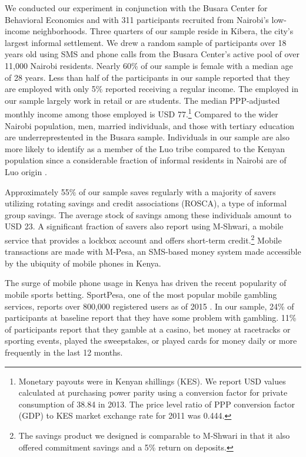 \documentclass[11pt]{article}
\begin{document}
		We conducted our experiment in conjunction with the Busara Center for Behavioral Economics and with 311 participants recruited from Nairobi's low-income neighborhoods. Three quarters of our sample reside in Kibera, the city's largest informal settlement. We drew a random sample of participants over 18 years old using SMS and phone calls from the Busara Center's active pool of over 11,000 Nairobi residents. Nearly 60\% of our sample is female with a median age of 28 years. Less than half of the participants in our sample reported that they are employed with only 5\% reported receiving a regular income. The employed in our sample largely work in retail or are students. The median PPP-adjusted monthly income among those employed is USD 77.\footnote{Monetary payouts were in Kenyan shillings (KES). We report USD values calculated at purchasing power parity using a conversion factor for private consumption of 38.84 in 2013. The price level ratio of PPP conversion factor (GDP) to KES market exchange rate for 2011 was 0.444.} Compared to the wider Nairobi population, men, married individuals, and those with tertiary education are underreprestented in the Busara sample. Individuals in our sample are also more likely to identify as a member of the Luo tribe compared to the Kenyan population since a considerable fraction of informal residents in Nairobi are of Luo origin \parencite{haushofer_methodology_2014}.

		Approximately 55\% of our sample saves regularly with a majority of savers utilizing rotating savings and credit associations (ROSCA), a type of informal group savings. The average stock of savings among these individuals amount to USD 23. A significant fraction of savers also report using M-Shwari, a mobile service that provides a lockbox account and offers short-term credit.\footnote{The savings product we designed is comparable to M-Shwari in that it also offered commitment savings and a 5\% return on deposits.} Mobile transactions are made with M-Pesa, an SMS-based money system made accessible by the ubiquity of mobile phones in Kenya.

		The surge of mobile phone usage in Kenya has driven the recent popularity of mobile sports betting. SportPesa, one of the most popular mobile gambling services, reports over 800,000 registered users as of 2015 \parencite{kemibaro_sportpesa_2015}. In our sample, 24\% of participants at baseline report that they have some problem with gambling. 11\% of participants report that they gamble at a casino, bet money at racetracks or sporting events, played the sweepstakes, or played cards for money daily or more frequently in the last 12 months.
\end{document}

